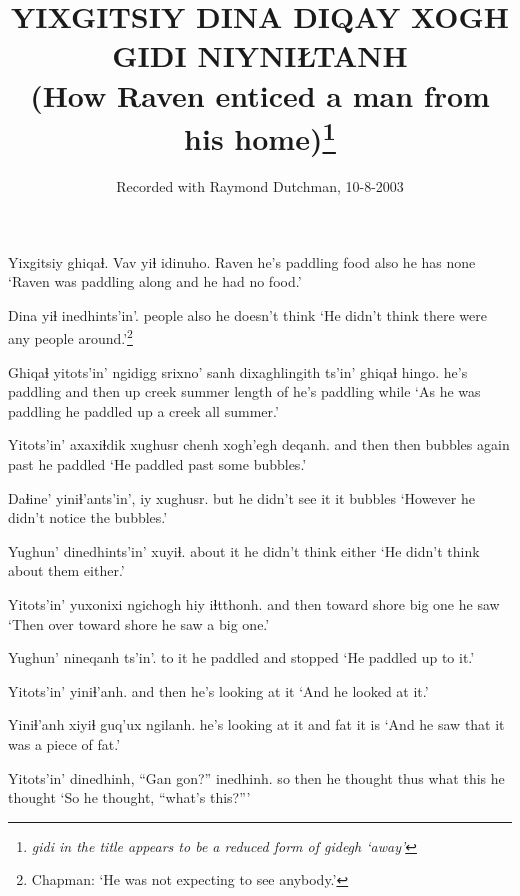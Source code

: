 \documentclass[12pt]{article}
\begin{document}
\title{YIXGITSIY DINA DIQAY XOGH GIDI NIYNIŁTANH
\\(How Raven enticed a man from his home)\footnote{\em gidi \em in the title appears to be a reduced form of \em gidegh \em `away'}}

\author{Recorded with Raymond Dutchman, 10-8-2003}
\date{}

\maketitle

\gll Yixgitsiy ghiqaɬ. Vav yiɬ idinuho.
Raven  {he's paddling} food also {he has none}
\glt `Raven was paddling along and he had no food.'
\glend

\gll Dina  yiɬ inedhints'in'.
people  also {he doesn't think} 
\glt `He didn't think there were any people around.'\footnote{Chapman: `He was not expecting to see anybody.'}
\glend

\gll Ghiqaɬ  yitots'in' ngidigg srixno' sanh  dixaghlingith ts'in' ghiqaɬ  hingo.
{he's paddling} {and then} up  creek  summer {length of} {} {he's paddling} while
\glt `As he was paddling he paddled up a creek all summer.'
\glend

\gll Yitots'in' axaxiɬdik xughusr chenh xogh'egh deqanh.
{and then} then  bubbles again past  {he paddled} 
\glt `He paddled past some bubbles.'
\glend

\gll Daɬine' yiniɬ'ants'in', iy xughusr.
but  {he didn't see it} it bubbles
\glt `However he didn't notice the bubbles.'
\glend

\gll Yughun' dinedhints'in' xuyiɬ.
{about it} {he didn't think}  either
\glt `He didn't think about them either.'
\glend

\gll Yitots'in' yuxonixi {ngichogh hiy} iɬtthonh.
{and then} {toward shore} {big one} {he saw}
\glt `Then over toward shore he saw a big one.'
\glend

\gll Yughun' nineqanh ts'in'.
{to it}  {he paddled and stopped}
\glt `He paddled up to it.'
\glend

\gll Yitots'in' yiniɬ'anh.
{and then} {he's looking at it}
\glt `And he looked at it.'
\glend

\gll Yiniɬ'anh xiyiɬ guq'ux ngilanh.
{he's looking at it} and fat  {it is}
\glt `And he saw that it was a piece of fat.'
\glend

\gll Yitots'in' dinedhinh, ``Gan gon?''  inedhinh.
{so then} {he thought thus}  what this  {he thought}
\glt `So he thought, ``what's this?'''
\glend
\end{document}
